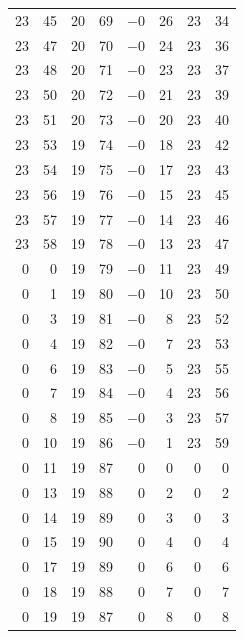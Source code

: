 \begin{center}
\begin{longtable}{rr c c rr rr}
23 & 45 & 20 & 69 & $-0$ & 26 & 23 & 34 \\
23 & 47 & 20 & 70 & $-0$ & 24 & 23 & 36 \\
23 & 48 & 20 & 71 & $-0$ & 23 & 23 & 37 \\
23 & 50 & 20 & 72 & $-0$ & 21 & 23 & 39 \\
23 & 51 & 20 & 73 & $-0$ & 20 & 23 & 40 \\
23 & 53 & 19 & 74 & $-0$ & 18 & 23 & 42 \\
23 & 54 & 19 & 75 & $-0$ & 17 & 23 & 43 \\
23 & 56 & 19 & 76 & $-0$ & 15 & 23 & 45 \\
23 & 57 & 19 & 77 & $-0$ & 14 & 23 & 46 \\
23 & 58 & 19 & 78 & $-0$ & 13 & 23 & 47 \\
0 & 0 & 19 & 79 & $-0$ & 11 & 23 & 49 \\
0 & 1 & 19 & 80 & $-0$ & 10 & 23 & 50 \\
0 & 3 & 19 & 81 & $-0$ & 8 & 23 & 52 \\
0 & 4 & 19 & 82 & $-0$ & 7 & 23 & 53 \\
0 & 6 & 19 & 83 & $-0$ & 5 & 23 & 55 \\
0 & 7 & 19 & 84 & $-0$ & 4 & 23 & 56 \\
0 & 8 & 19 & 85 & $-0$ & 3 & 23 & 57 \\
0 & 10 & 19 & 86 & $-0$ & 1 & 23 & 59 \\
0 & 11 & 19 & 87 & 0 & 0 & 0 & 0 \\
0 & 13 & 19 & 88 & 0 & 2 & 0 & 2 \\
0 & 14 & 19 & 89 & 0 & 3 & 0 & 3 \\
0 & 15 & 19 & 90 & 0 & 4 & 0 & 4 \\
0 & 17 & 19 & 89 & 0 & 6 & 0 & 6 \\
0 & 18 & 19 & 88 & 0 & 7 & 0 & 7 \\
0 & 19 & 19 & 87 & 0 & 8 & 0 & 8 \\
\end{longtable}
\end{center}
